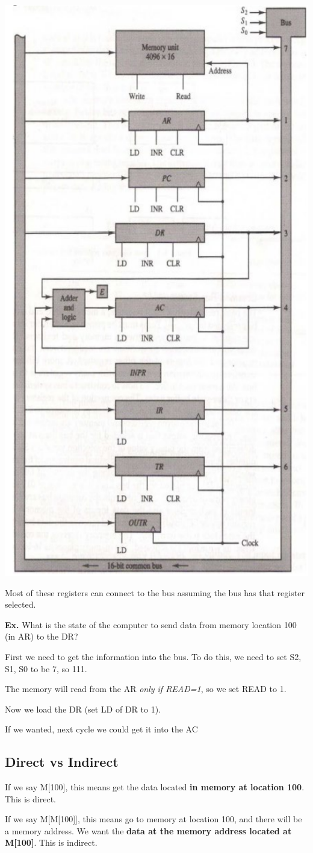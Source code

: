 \documentclass[12pt,letterpaper]{article} \usepackage{amsmath} \usepackage{graphicx} \usepackage[margin=1in]{geometry} \usepackage{longtable}  \usepackage{amssymb}
\begin{document}
			\begin{center}
				\includegraphics[width=0.4\linewidth]{registers}
			\end{center}
		
			Most of these registers can connect to the bus assuming the bus has that register selected. 
			
			\begin{mdframed}[]
			\textbf{Ex. } What is the state of the computer to send data from memory location 100 (in AR) to the DR?
			
			First we need to get the information into the bus. To do this, we need to set S2, S1, S0 to be 7, so 111. 
			
			The memory will read from the AR \textit{only if READ=1}, so we set READ to 1. 
			
			Now we load the DR (set LD of DR to 1).
			
			If we wanted, next cycle we could get it into the AC
			
			\end{mdframed}
			
			\subsection{Direct vs Indirect}
			If we say M[100], this means get the data located \textbf{in memory at location 100}. This is direct. 
			
			If we say M[M[100]], this means go to memory at location 100, and there will be a memory address. We want the \textbf{data at the memory address located at M[100]}. This is indirect.
			
\end{document}
